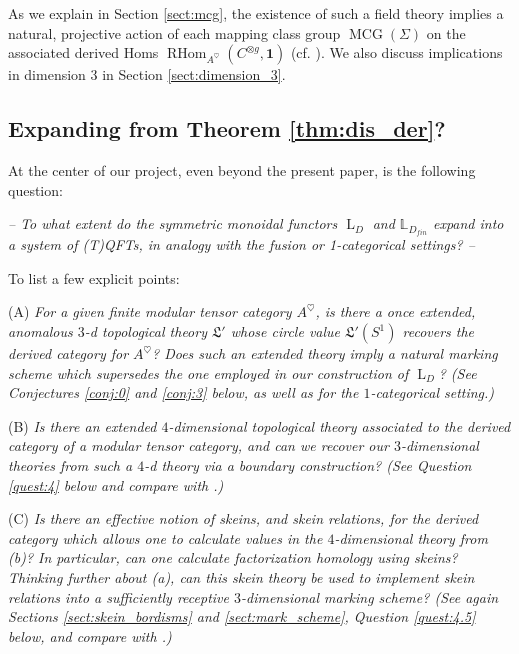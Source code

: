 \documentclass[reqno]{amsart}
\theoremstyle{definition}
\newcommand{\mfk}[1]{\mathfrak{#1}}
\newcommand{\mbb}[1]{\mathbb{#1}}
\newcommand{\opn}[1]{\operatorname{#1}}
\newcommand{\ot}{\otimes}
\renewcommand{\1}{\mathbf{1}}
\begin{document}
As we explain in Section \ref{sect:mcg}, the existence of such a field theory implies a natural, projective action of each mapping class group $\opn{MCG}(\Sigma)$ on the associated derived Homs $\opn{RHom}_{A^{\heartsuit}}(C^{\ot g},\1)$ (cf. \cite{lentneretal23,schweigertwoike21}). We also discuss implications in dimension $3$ in Section \ref{sect:dimension_3}.

\subsection{Expanding from Theorem \ref{thm:dis_der}?}
\label{sect:expansion}

At the center of our project, even beyond the present paper, is the following question:\vspace{1.5mm}

{\it -- To what extent do the symmetric monoidal functors $\opn{L}_D$ and $\mbb{L}_{D_{fin}}$ \emph{expand} into a system of (T)QFTs, in analogy with the fusion or 1-categorical settings? --}\vspace{1.5mm}

To list a few explicit points:\vspace{1.5mm}

\noindent(A) {\it For a given finite modular tensor category $A^{\heartsuit}$, is there a once extended, anomalous $3$-d topological theory $\mfk{L}'$ whose circle value $\mfk{L}'(S^1)$ recovers the derived category for $A^{\heartsuit}$? Does such an extended theory imply a natural marking scheme which supersedes the one employed in our construction of $\opn{L}_D$? (See Conjectures \ref{conj:0} and \ref{conj:3} below, as well as \cite{bartlettetal,derenzi21,lagiotis} for the $1$-categorical setting.)}\vspace{1.5mm}

\noindent(B) {\it Is there an extended \emph{$4$-dimensional} topological theory associated to the derived category of a modular tensor category, and can we recover our $3$-dimensional theories from such a $4$-d theory via a boundary construction? (See Question \ref{quest:4} below and compare with \cite{haioun}.)}\vspace{1.5mm}

\noindent(C) {\it Is there an effective notion of skeins, and skein relations, for the derived category which allows one to calculate values in the $4$-dimensional theory from (b)? In particular, can one calculate factorization homology using skeins?  Thinking further about (a), can this skein theory be used to implement skein relations into a sufficiently receptive $3$-dimensional marking scheme? (See again Sections \ref{sect:skein_bordisms} and \ref{sect:mark_scheme}, Question \ref{quest:4.5} below, and compare with \cite{costantinoetalII,brownhaioun}.)}\vspace{1.5mm}
\end{document}
